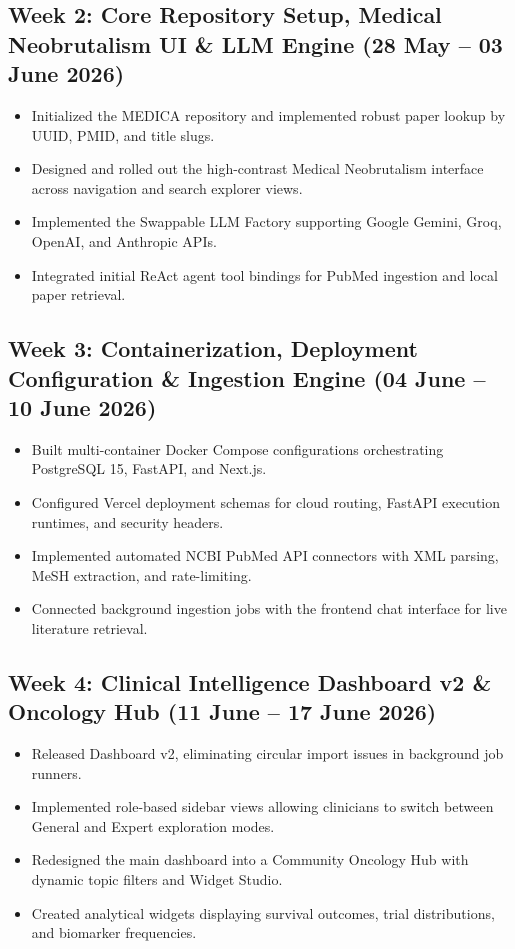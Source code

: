 \documentclass[11pt,a4paper]{article}
\begin{document}
\subsection*{Week 2: Core Repository Setup, Medical Neobrutalism UI \& LLM Engine (28 May -- 03 June 2026)}
\begin{itemize}[leftmargin=*,noitemsep]
    \item Initialized the MEDICA repository and implemented robust paper lookup by UUID, PMID, and title slugs.
    \item Designed and rolled out the high-contrast Medical Neobrutalism interface across navigation and search explorer views.
    \item Implemented the Swappable LLM Factory supporting Google Gemini, Groq, OpenAI, and Anthropic APIs.
    \item Integrated initial ReAct agent tool bindings for PubMed ingestion and local paper retrieval.
\end{itemize}

\subsection*{Week 3: Containerization, Deployment Configuration \& Ingestion Engine (04 June -- 10 June 2026)}
\begin{itemize}[leftmargin=*,noitemsep]
    \item Built multi-container Docker Compose configurations orchestrating PostgreSQL 15, FastAPI, and Next.js.
    \item Configured Vercel deployment schemas for cloud routing, FastAPI execution runtimes, and security headers.
    \item Implemented automated NCBI PubMed API connectors with XML parsing, MeSH extraction, and rate-limiting.
    \item Connected background ingestion jobs with the frontend chat interface for live literature retrieval.
\end{itemize}

\subsection*{Week 4: Clinical Intelligence Dashboard v2 \& Oncology Hub (11 June -- 17 June 2026)}
\begin{itemize}[leftmargin=*,noitemsep]
    \item Released Dashboard v2, eliminating circular import issues in background job runners.
    \item Implemented role-based sidebar views allowing clinicians to switch between General and Expert exploration modes.
    \item Redesigned the main dashboard into a Community Oncology Hub with dynamic topic filters and Widget Studio.
    \item Created analytical widgets displaying survival outcomes, trial distributions, and biomarker frequencies.
\end{itemize}
\end{document}
